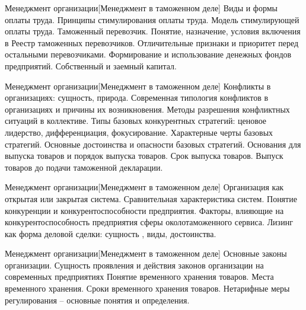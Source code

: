 \documentclass[
	11pt,
	a4paper,
	]
	{article}
\begin{document}
\begin{minipage}[t][\miniH]{\miniL}\centering
	 {Менеджмент организации}[Менеджмент в таможенном деле]
		{
			Виды и формы оплаты труда. Принципы стимулирования оплаты труда. Модель стимулирующей оплаты труда.
		}{
			Таможенный перевозчик. Понятие, назначение, условия включения в Реестр таможенных перевозчиков. Отличительные признаки и приоритет перед остальными перевозчиками.
		}{
			Формирование и использование денежных фондов предприятий. Собственный и заемный капитал.
		}
	\lowGE
\end{minipage}

\vfill



\begin{minipage}[t][\miniH]{\miniL}\centering
	 {Менеджмент организации}[Менеджмент в таможенном деле]
		{
			Конфликты в организациях: сущность, природа. Современная типология конфликтов в организациях и причины их возникновения. Методы разрешения конфликтных ситуаций в коллективе.
		}{
			Типы базовых конкурентных стратегий: ценовое лидерство, дифференциация, фокусирование. Характерные черты базовых стратегий. Основные достоинства и опасности базовых стратегий.
		}{
			Основания для выпуска товаров и порядок выпуска товаров. Срок выпуска товаров. Выпуск товаров до подачи таможенной декларации.
		}
	\lowGE
\end{minipage}

\vfill



\begin{minipage}[t][\miniH]{\miniL}\centering
	 {Менеджмент организации}[Менеджмент в таможенном деле]
		{
			Организация как открытая или закрытая система. Сравнительная характеристика систем.
		}{
			Понятие конкуренции и конкурентоспособности предприятия. Факторы, влияющие на конкурентоспособность предприятия сферы околотаможенного сервиса.
		}{
			Лизинг как форма деловой сделки: сущность , виды, достоинства.
		}
	\lowGE
\end{minipage}





\begin{minipage}[t][\miniH]{\miniL}\centering
	 {Менеджмент организации}[Менеджмент в таможенном деле]
		{
			Основные законы организации. Сущность проявления и действия законов организации на современных предприятиях
		}{
			Понятие временного хранения товаров. Места временного хранения. Сроки временного хранения товаров.
		}{
			Нетарифные меры регулирования – основные понятия и определения.
		}
	\lowGE
\end{minipage}
\end{document}
